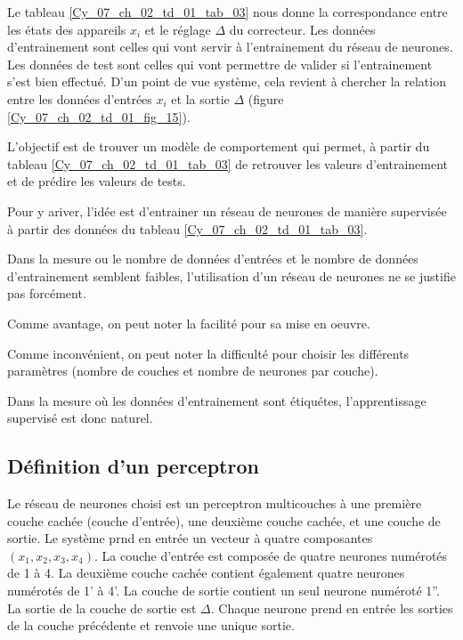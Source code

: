 Le tableau \ref{Cy_07_ch_02_td_01_tab_03} nous donne la correspondance entre les états des appareils $x_i$ et le réglage $\Delta$ du correcteur. Les données d'entrainement sont celles qui vont servir à l'entrainement du réseau de neurones. Les données de test sont celles qui vont permettre de valider si l'entrainement s'est bien effectué. D'un point de vue système, cela revient à chercher la relation entre les données d'entrées $x_i$ et la sortie $\Delta$ (figure \ref{Cy_07_ch_02_td_01_fig_15}). 


L'objectif est de trouver un modèle de comportement qui permet, à partir du tableau \ref{Cy_07_ch_02_td_01_tab_03} de retrouver les valeurs d'entrainement et de prédire les valeurs de tests. 

Pour y ariver, l'idée est d'entrainer un réseau de neurones de manière supervisée à partir des données du tableau \ref{Cy_07_ch_02_td_01_tab_03}.

\ifprof
\begin{corrige}
Dans la mesure ou le nombre de données d'entrées et le nombre de données d'entrainement semblent faibles, l'utilisation d'un réseau de neurones ne se justifie pas forcément. 

Comme avantage, on peut noter la facilité pour sa mise en oeuvre. 

Comme inconvénient, on peut noter la difficulté pour choisir les différents paramètres (nombre de couches et nombre de neurones par couche).

\end{corrige}
\else
\fi

\ifprof
\begin{corrige}
Dans la mesure où les données d'entrainement sont étiquétes, l'apprentissage supervisé est donc naturel.
\end{corrige}
\else
\fi


\subsection*{Définition d'un perceptron}

Le réseau de neurones choisi est un perceptron multicouches à une première couche cachée (couche d'entrée), une deuxième couche cachée, et une couche de sortie. Le système prnd en entrée un vecteur à quatre composantes $\left(x_1, x_2, x_3, x_4 \right)$. La couche d'entrée est composée de quatre neurones numérotés de 1 à 4. La deuxième couche cachée contient également quatre neurones numérotés de 1' à 4'. La couche de sortie contient un seul neurone numéroté 1''. La sortie de la couche de sortie est $\Delta$. Chaque neurone prend en entrée les sorties de la couche précédente et renvoie une unique sortie.

